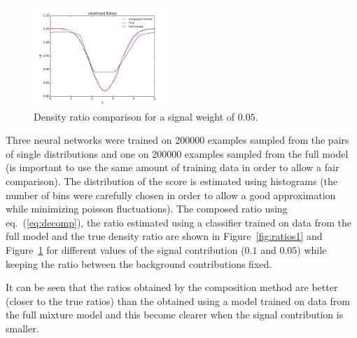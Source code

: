 \documentclass[a4paper]{jpconf}
\begin{document}
\begin{figure}[h]
\begin{minipage}{12pc}
\includegraphics[width=12pc]{all_train_mlp_ratio_05.pdf}
\caption{\label{fig:ratios2} Density ratio comparison for a signal weight of $0.05$.}
\end{minipage}
\end{figure}

Three neural networks were trained on 200000 examples sampled from the pairs of single distributions and one on 200000 examples sampled from the full model (is important to use the same amount of training data in order to allow a fair comparison). The distribution of the score is estimated using histograms (the number of bins were carefully chosen in order to allow a good approximation while minimizing poisson fluctuations). The composed ratio using 
eq.~(\ref{eq:decomp}), the ratio estimated using a classifier trained on data from the full model and the true density ratio are shown in Figure~\ref{fig:ratios1} and Figure~\ref{fig:ratios2} for different values of the signal contribution ($0.1$ and $0.05$) while keeping the ratio between the background contributions fixed. 

It can be seen that the ratios obtained by the composition method are better (closer to the true ratios) than the obtained using a model trained on data from the full mixture model and this become clearer when the signal contribution is smaller.
\end{document}
